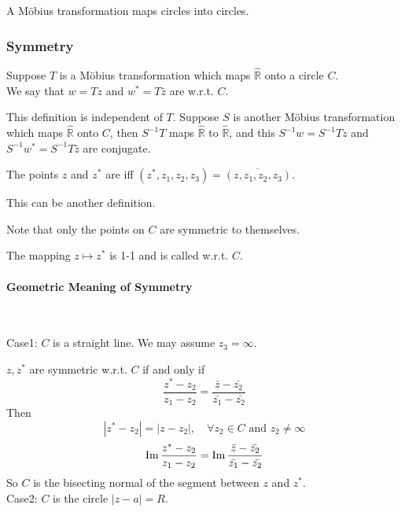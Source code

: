 \begin{theorem}
    A M{\"o}bius transformation maps circles into circles.
\end{theorem}
\subsubsection{Symmetry}
Suppose  $ T  $ is a M{\"o}bius transformation which maps  $ \hat{\mathbb{R}}  $ onto a circle  $ C $. \\
We say that  $ w=Tz  $ and  $ w^*=T\bar{z} $ are  w.r.t.  $ C $.
\begin{remark}
    This definition is independent of  $ T $. Suppose  $ S  $ is another M{\"o}bius transformation which maps  $ \hat{\mathbb{R}} $ onto  $ C $, then  $ S^{-1}T $ maps  $ \hat{\mathbb{R}} $ to  $ \hat{\mathbb{R}} $, and this  $ S^{-1}w=S^{-1}Tz $ and  $ S^{-1}w^*=S^{-1}T\bar{z} $ are conjugate.       
\end{remark}  
The points  $ z  $ and  $ z^* $ are  iff  $ (z^*,z_1,z_2,z_3)=\overline{(z,z_1,z_2,z_3)} $.

This can be another definition. 

Note that only the points on  $ C  $ are symmetric to themselves.

The mapping  $ z\mapsto z^* $ is 1-1 and is called  w.r.t. $ C $.

\paragraph{Geometric Meaning of Symmetry} 
\,

Case1:  $ C  $ is a straight line. We may assume  $ z_3=\infty $. 

$ z,z^* $ are symmetric w.r.t.  $ C $ if and only if 
\[\frac{z^*-z_2}{z_1-z_2}=\frac{\bar{z}-\bar{z_2}}{\bar{z_1}-\bar{z_2}}\]
Then 
\[|z^*-z_2|=|z-z_2|,\quad \forall z_2\in C\text{ and }z_2\neq\infty\]
\[\operatorname{Im}\frac{z^*-z_2}{z_1-z_2}=\operatorname{Im}\frac{\bar{z}-\bar{z_2}}{\bar{z_1}-\bar{z_2}}\]   
So  $ C  $ is the bisecting normal of the segment between  $ z  $ and  $ z^
 * $.\\
Case2: $ C  $ is the circle  $ |z-a|=R $.

